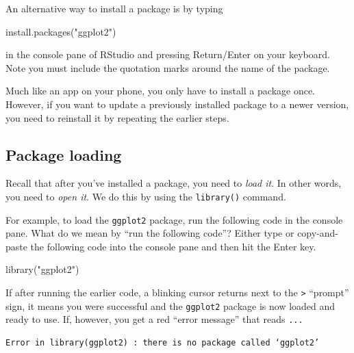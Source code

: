 \documentclass[
  12pt,
  oneside]{book}
\newenvironment{Shaded}{\begin{snugshade}}{\end{snugshade}}
\newcommand{\FunctionTok}[1]{\textcolor[rgb]{0.00,0.00,0.00}{#1}}
\newcommand{\NormalTok}[1]{#1}
\newcommand{\StringTok}[1]{\textcolor[rgb]{0.31,0.60,0.02}{#1}}
\begin{document}
An alternative way to install a package is by typing

\begin{Shaded}
\begin{Highlighting}[]
\FunctionTok{install.packages}\NormalTok{(}\StringTok{"ggplot2"}\NormalTok{)}
\end{Highlighting}
\end{Shaded}

in the console pane of RStudio and pressing Return/Enter on your keyboard. Note you must include the quotation marks around the name of the package.

Much like an app on your phone, you only have to install a package once. However, if you want to update a previously installed package to a newer version, you need to reinstall it by repeating the earlier steps.

\hypertarget{package-loading}{%
\subsection{Package loading}\label{package-loading}}

Recall that after you've installed a package, you need to \emph{load it}. In other words, you need to \emph{open it}. We do this by using the \texttt{library()} command. 

For example, to load the \texttt{ggplot2} package, run the following code in the console pane. What do we mean by ``run the following code''? Either type or copy-and-paste the following code into the console pane and then hit the Enter key.

\begin{Shaded}
\begin{Highlighting}[]
\FunctionTok{library}\NormalTok{(}\StringTok{"ggplot2"}\NormalTok{)}
\end{Highlighting}
\end{Shaded}

If after running the earlier code, a blinking cursor returns next to the \texttt{\textgreater{}} ``prompt'' sign, it means you were successful and the \texttt{ggplot2} package is now loaded and ready to use. If, however, you get a red ``error message'' that reads \texttt{...} 

\begin{verbatim}
Error in library(ggplot2) : there is no package called ‘ggplot2’
\end{verbatim}
\end{document}
